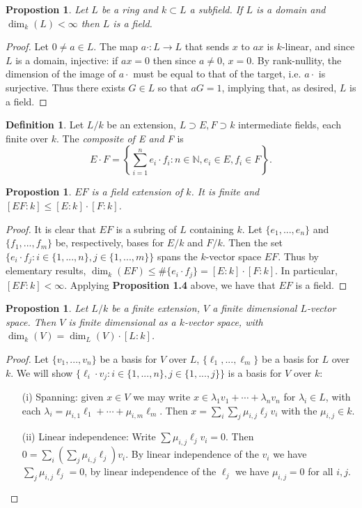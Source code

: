 \documentclass{amsart}
\newcommand{\NN}{\mathbb{N}}
\newtheorem{prop}[thm]{Propostion}
\theoremstyle{definition}
\newtheorem{defn}[thm]{Definition}
\theoremstyle{remark}
\begin{document}
\begin{prop}
Let $L$ be a ring and $k \subset L$ a subfield. If $L$ is a domain and $\dim_k(L) < \infty$ then $L$ is a field.
\end{prop}
\begin{proof}
Let $0 \neq a \in L$. The map $a \cdot \colon L \rightarrow L$ that sends $x$ to $ax$ is $k$-linear, and since $L$ is a domain, injective: if $ax = 0$ then since $a \neq 0$, $x = 0$. By rank-nullity, the dimension of the image of $a \cdot$ must be equal to that of the target, i.e. $a \cdot$ is surjective. Thus there exists $G \in L$ so that $aG = 1$, implying that, as desired, $L$ is a field.
\end{proof}

\begin{defn}
Let $L/k$ be an extension, $L \supset E, F \supset k$ intermediate fields, each finite over $k$. The \textit{composite of E and F} is 
\[E \cdot F = \left\{ \sum_{i = 1}^n e_i \cdot f_i \colon n \in \NN, e_i \in E, f_i \in F \right\}.\]
\end{defn}

\begin{prop}
$EF$ is a field extension of $k$. It is finite and $[EF : k] \leq [E : k] \cdot [F : k]$.
\end{prop}
\begin{proof}
It is clear that $EF$ is a subring of $L$ containing $k$. Let $\{e_1, ..., e_n\}$ and $\{f_1, ..., f_m\}$ be, respectively, bases for $E/k$ and $F/k$. Then the set $\{e_i \cdot f_j \colon i \in \{1, ..., n\}, j \in \{1, ..., m\}\}$ spans the $k$-vector space $EF$. Thus by elementary results, $\dim_k(EF) \leq \#\{e_i \cdot f_j\} = [E : k] \cdot [F : k]$. In particular, $[EF : k] < \infty$. Applying \textbf{Proposition 1.4} above, we have that $EF$ is a field.
\end{proof}

\begin{prop}
Let $L/k$ be a finite extension, $V$ a finite dimensional $L$-vector space. Then $V$ is finite dimensional as a $k$-vector space, with $\dim_k(V) = \dim_L(V) \cdot [L : k]$.
\end{prop}
\begin{proof}
Let $\{v_1, ..., v_n\}$ be a basis for $V$ over $L$, $\{\ell_1, ..., \ell_m\}$ be a basis for $L$ over $k$. We will show $\{\ell_i \cdot v_j \colon i \in \{1, ..., n\}, j \in \{1, ..., j\}\}$ is a basis for $V$ over $k$:
\begin{enumerate}
\item[(i)] Spanning: given $x \in V$ we may write $x \in \lambda_1v_1 + \cdots + \lambda_nv_n$ for $\lambda_i \in L$, with each $\lambda_i = \mu_{i,1}\ell_1 + \cdots + \mu_{i,m}\ell_m$. Then $x = \sum_i \sum_j \mu_{i, j} \ell_j v_i$ with the $\mu_{i,j} \in k$.
\item[(ii)] Linear independence: Write $\sum \mu_{i,j} \ell_j v_i = 0$. Then $0 = \sum_i \left( \sum_j\mu_{i,j} \ell_j \right) v_i$. By linear independence of the $v_i$ we have $\sum_j\mu_{i,j} \ell_j = 0$, by linear independence of the $\ell_j$ we have $\mu_{i,j} = 0$ for all $i,j$.
\end{enumerate}
\end{proof}
\end{document}
